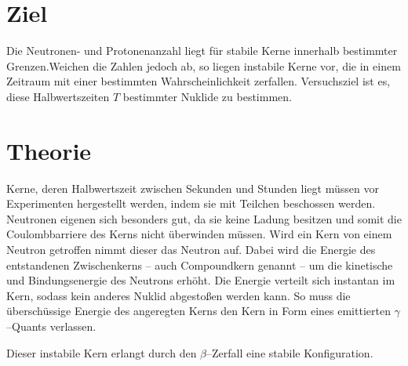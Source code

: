 \section{Ziel}
\label{sec:Ziel}
Die Neutronen- und Protonenanzahl liegt für stabile Kerne innerhalb bestimmter Grenzen.Weichen die Zahlen jedoch ab, so liegen instabile Kerne vor, die in einem Zeitraum mit einer bestimmten Wahrscheinlichkeit zerfallen.
Versuchsziel ist es, diese Halbwertszeiten $T$ bestimmter Nuklide zu bestimmen.
\section{Theorie}
\label{sec:Theorie}
Kerne, deren Halbwertszeit zwischen Sekunden und Stunden liegt müssen vor Experimenten hergestellt werden, indem sie mit Teilchen beschossen werden. Neutronen eigenen sich besonders gut, da sie keine Ladung besitzen und somit die Coulombbarriere des Kerns nicht überwinden müssen.
Wird ein Kern von einem Neutron getroffen nimmt dieser das Neutron auf. Dabei wird die Energie des entstandenen Zwischenkerns -- auch Compoundkern genannt -- um die kinetische und Bindungsenergie des Neutrons erhöht. Die Energie verteilt sich instantan im Kern, sodass kein anderes Nuklid abgestoßen werden kann. So muss die überschüssige Energie des angeregten Kerns den Kern in Form eines emittierten $\gamma$--Quants verlassen. 


Dieser instabile Kern erlangt durch den $\beta$--Zerfall eine stabile Konfiguration.


